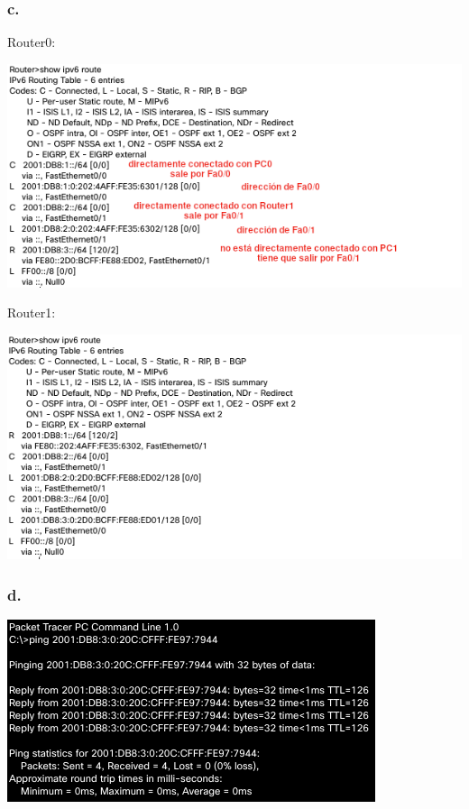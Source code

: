 \documentclass[11pt]{article}
\begin{document}
\subsubsection*{c.}
\label{sec:orgc5de811}
Router0:
\begin{center}
\includegraphics[width=.9\linewidth]{./r0route.png}
\end{center}

Router1:
\begin{center}
\includegraphics[width=.9\linewidth]{./r1route.png}
\end{center}
\subsubsection*{d.}
\label{sec:org5a96f7c}
\begin{center}
\includegraphics[width=.9\linewidth]{./ping.png}
\end{center}
\end{document}
